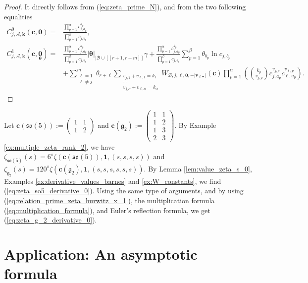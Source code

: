\documentclass[a4paper]{amsart}
\theoremstyle{remark}
\theoremstyle{definition}
\begin{document}
\begin{proof}
It directly follows from (\ref{eq:zeta_prime_N}), and from the two following equalities
\begin{align*}
    C^0_{j,\mathcal{A},\mathbf{k}}(\mathbf{c},\mathbf{0})=& \frac{\prod_{p=1}^\alpha c_{j,a_p}^{k_p}}{\prod_{p=1}^\beta c_{j,b_p}}, \\
    C_{j,\mathcal{A},\mathbf{k}}^1(\mathbf{c},\underset{\bm{\theta}}{\mathbf{0}}) =& \frac{\prod_{p=1}^\alpha c_{j,a_p}^{k_p}}{\prod_{p=1}^\beta c_{j,b_p}} |\bm{\theta}|_{|\mathcal{B}\cup[\![r+1,r+m]\!]} \gamma + \frac{\prod_{p=1}^\alpha c_{j,a_p}^{k_p}}{\prod_{p=1}^\beta c_{j,b_p}} \sum_{p=1}^{\beta} \theta_{b_p} \ln c_{j,{b_p}} \\
    & + \sum_{\substack{\ell=1 \\ \ell \neq j}}^{m} \theta_{r+\ell} \sum_{\substack{v_{j,1}+v_{\ell,1}=k_1 \\ \cdots \\ v_{j,\alpha}+v_{\ell,\alpha} = k_{\alpha}}} W_{\mathcal{B},j,\ell,\mathbf{0},-|\mathbf{v}_{\ell \bullet}|}(\mathbf{c}) \prod_{p=1}^{\alpha} \left( \binom{k_p}{v_{j,p}} c_{j,a_p}^{v_{j,p}}c_{\ell,a_p}^{v_{\ell,p}} \right).
\end{align*}
\end{proof}

Let 
$\mathbf{c}(\mathfrak{so}(5)):=\left(
\begin{smallmatrix}
    1 & 1\\
    1 & 2
\end{smallmatrix} 
\right)$ and 
$\mathbf{c}(\mathfrak{g}_2) := \left(
\begin{smallmatrix}
    1 & 1\\
    1 & 2\\
    1 & 3\\
    2 & 3
\end{smallmatrix}\right)$. 
By Example \ref{ex:multiple_zeta_rank_2}, we have $\zeta_{\mathfrak{so}(5)}(s)=6^s\zeta(\mathbf{c}(\mathfrak{so}(5)),\mathbf{1},(s,s,s,s))$ and $\zeta_{\mathfrak{g}_2}(s)=120^s\zeta(\mathbf{c}(\mathfrak{g}_2),\mathbf{1},(s,s,s,s,s,s))$. By Lemma \ref{lem:value_zeta_s_0}, Examples \ref{ex:derivative_values_barnes} and \ref{ex:W_constants}, we find (\ref{eq:zeta_so5_derivative_0}). Using the same type of arguments, and by using (\ref{eq:relation_prime_zeta_hurwitz_x_1}), the multiplication formula (\ref{eq:multiplication_formula}), and Euler's reflection formula, we get (\ref{eq:zeta_g_2_derivative_0}).

\section{Application: An asymptotic formula}
\label{section:asymptotic_formula}
\end{document}
